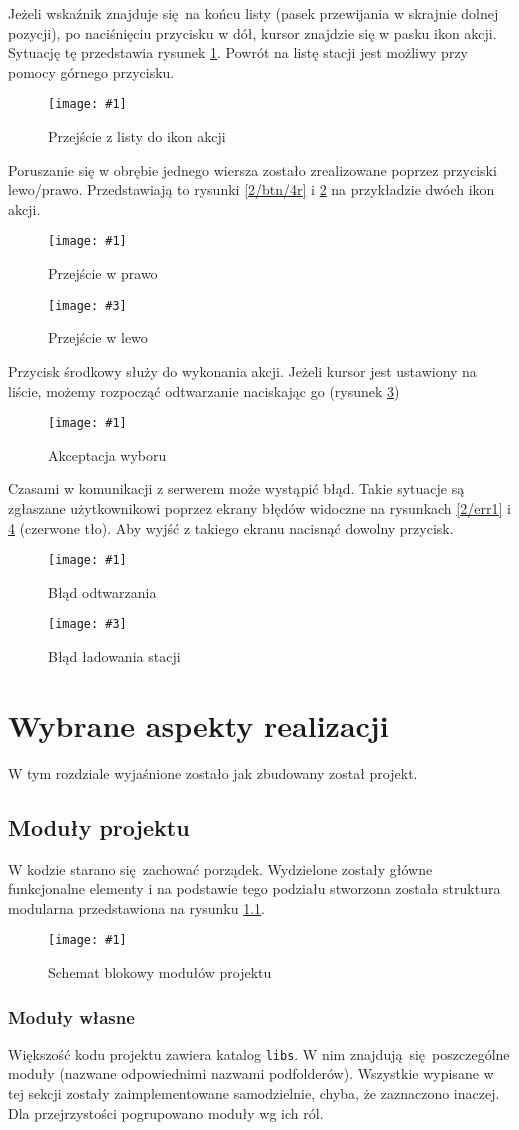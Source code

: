 \documentclass[polish]{aghengthesis}
\newcommand{\imgint}[4]{
	\begin{figure}[{#4}]
		\centering
		\texttt{[image: \#1]}
		\caption{#2}
		\label{#1}
	\end{figure}
}
\newcommand{\imgh}[3]{\imgint{#1}{#2}{#3}{H}}
\newcommand{\imgintss}[5]{
	\begin{figure}[{#5}]
		\centering
		\begin{minipage}{.45\textwidth}
			\centering
			\texttt{[image: \#1]}
			\caption{#2}
			\label{#1}
		\end{minipage}%
		\hfill
		\begin{minipage}{.45\textwidth}
			\centering
			\texttt{[image: \#3]}
			\caption{#4}
			\label{#3}
		\end{minipage}
	\end{figure}
}
\newcommand{\imghss}[4]{\imgintss{#1}{#2}{#3}{#4}{H}}
\begin{document}
		Jeżeli wskaźnik znajduje się na końcu listy (pasek przewijania w skrajnie dolnej pozycji), po naciśnięciu przycisku w dół, kursor znajdzie się w pasku ikon akcji. Sytuację tę przedstawia rysunek \ref{2/btn/3}. Powrót na listę stacji jest możliwy przy pomocy górnego przycisku.
		\imgh{2/btn/3}{Przejście z listy do ikon akcji}{0.7}
		
		Poruszanie się w obrębie jednego wiersza zostało zrealizowane poprzez przyciski \mbox{lewo/prawo}. Przedstawiają to rysunki \ref{2/btn/4r} i \ref{2/btn/4l} na przykładzie dwóch ikon akcji.
		\imghss{2/btn/4r}{Przejście w prawo}{2/btn/4l}{Przejście w lewo}
		
		Przycisk środkowy służy do wykonania akcji. Jeżeli kursor jest ustawiony na liście, możemy rozpocząć odtwarzanie naciskając go (rysunek \ref{2/btn/5})
		\imgh{2/btn/5}{Akceptacja wyboru}{0.7}
				
		Czasami w komunikacji z serwerem może wystąpić błąd. Takie sytuacje są zgłaszane użytkownikowi poprzez ekrany błędów widoczne na rysunkach \ref{2/err1} i \ref{2/err2} (czerwone tło). Aby wyjść z takiego ekranu nacisnąć dowolny przycisk.
		\imghss{2/err1}{Błąd odtwarzania}{2/err2}{Błąd ładowania stacji}

\chapter{Wybrane aspekty realizacji}
	W tym rozdziale wyjaśnione zostało jak zbudowany został projekt.
	
	\section{Moduły projektu}
		W kodzie starano się zachować porządek. Wydzielone zostały główne funkcjonalne elementy i na podstawie tego podziału stworzona została struktura modularna przedstawiona na rysunku \ref{3/pico-radio-code-block-diagram}.
		\imgh{3/pico-radio-code-block-diagram}{Schemat blokowy modułów projektu}{0.7}
		
		\subsection{Moduły własne}
			Większość kodu projektu zawiera katalog \lstinline|libs|. W nim znajdują się poszczególne moduły (nazwane odpowiednimi nazwami podfolderów). Wszystkie wypisane w tej sekcji zostały zaimplementowane samodzielnie, chyba, że zaznaczono inaczej. Dla przejrzystości pogrupowano moduły wg ich ról.
		
\end{document}
